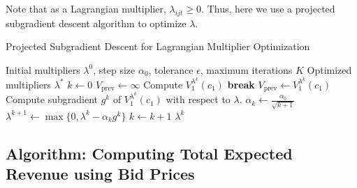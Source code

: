 \documentclass[11pt]{article}
\begin{document}
\noindent
Note that as a Lagrangian multiplier, $\lambda_{ijt} \ge 0$. 
Thus, here we use a projected subgradient descent algorithm to optimize $\lambda$.
\begin{algorithm}[H]
\caption{Projected Subgradient Descent for Lagrangian Multiplier Optimization}
\begin{algorithmic}[1]
\Require Initial multipliers $\lambda^0$, step size $\alpha_0$, tolerance $\epsilon$, maximum iterations $K$
\Ensure Optimized multipliers $\lambda^*$
\State $k \gets 0$
\State $V_{\text{prev}} \gets \infty$
    \State Compute $V^{\lambda^k}_{1}(c_{1})$
        \State \textbf{break}
    \EndIf
    \State $V_{\text{prev}} \gets V^{\lambda^k}_{1}(c_{1})$
    \State Compute subgradient $g^k$ of $V^{\lambda^k}_{1}(c_{1})$ with respect to $\lambda$. 
    \State $\alpha_k \gets \frac{\alpha_0}{\sqrt{k+1}}$
    \State $\lambda^{k+1} \gets \max\{0, \lambda^k - \alpha_k g^k\}$ 
    \State $k \gets k + 1$
\EndWhile
\State \Return $\lambda^k$
\end{algorithmic}
\end{algorithm}

\vspace{0.5cm}






\newpage

\subsection{Algorithm: Computing Total Expected Revenue using Bid Prices}
\end{document}
